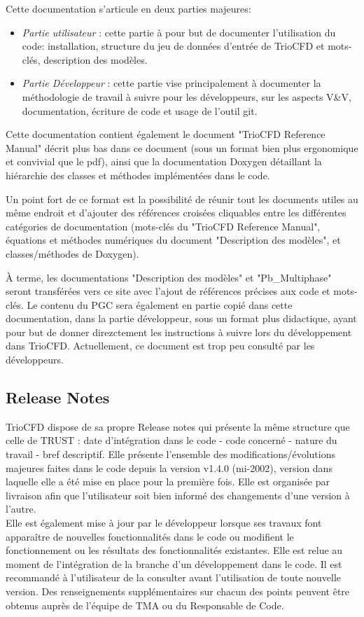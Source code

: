 Cette documentation s'articule en deux parties majeures:
\begin{itemize}
\item \textit{Partie utilisateur} : cette partie à pour but de documenter l'utilisation du code: installation, structure du jeu de données d'entrée de TrioCFD et mots-clés, description des modèles.
\item \textit{Partie Développeur} : cette partie vise principalement à documenter la méthodologie de travail à suivre pour les développeurs, sur les aspects V\&V, documentation, écriture de code et usage de l'outil git.
\end{itemize}

Cette documentation contient également le document "TrioCFD Reference Manual" décrit plus bas dans ce document (sous un format bien plus ergonomique et convivial que le pdf), ainsi que la documentation Doxygen détaillant la hiérarchie des classes et méthodes implémentées dans le code.

Un point fort de ce format est la possibilité de réunir tout les documents utiles au même endroit et d'ajouter des références croisées cliquables entre les différentes catégories de documentation (mots-clés du "TrioCFD Reference Manual", équations et méthodes numériques du document "Description des mod\`eles", et classes/méthodes de Doxygen).

\`A terme, les documentations "Description des mod\`eles" et "Pb\_Multiphase" seront transférées vers ce site avec l'ajout de références précises aux code et mots-clés.
Le contenu du PGC sera également en partie copié dans cette documentation, dans la partie développeur, sous un format plus didactique, ayant pour but de donner direzctement les instructions à suivre lors du développement dans TrioCFD. Actuellement, ce document est trop peu consulté par les développeurs.

\subsection{Release Notes}
TrioCFD dispose de sa propre Release notes qui présente la même structure que celle de TRUST : date d'intégration dans le code - code concerné - nature du travail - bref descriptif. Elle présente l'ensemble des modifications/évolutions majeures faites dans le code depuis la version v1.4.0 (mi-2002), version dans laquelle elle a été mise en place pour la première fois. Elle est organisée par livraison afin que l'utilisateur soit bien informé des changements d'une version à l'autre.\\
Elle est également mise à jour par le développeur lorsque ses travaux font apparaître de nouvelles fonctionnalités dans le code ou modifient le fonctionnement ou les résultats des fonctionnalités existantes. Elle est relue au moment de l'intégration de la branche d'un développement dans le code. Il est recommandé à l'utilisateur de la consulter avant l'utilisation de toute nouvelle version. Des renseignements supplémentaires sur chacun des points peuvent être obtenus auprès de l'équipe de TMA ou du Responsable de Code.

